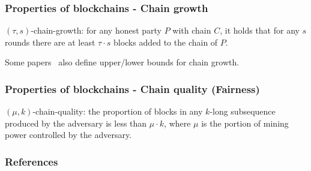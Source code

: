 \documentclass{beamer}
\begin{document}
\begin{frame}
\frametitle{Properties of blockchains - Chain growth}

$(\tau, s)$-chain-growth:
for any honest party $P$ with chain $C$, it holds that for any $s$ rounds there are at least $\tau \cdot s$ blocks added to the chain of $P$.

Some papers~\cite{rocket2018snowflake}\cite{pass2017sleepy} also define upper/lower bounds for chain growth.


\end{frame}


\begin{frame}
\frametitle{Properties of blockchains - Chain quality (Fairness)}
    
$(\mu, k)$-chain-quality: the proportion of blocks in any $k$-long subsequence produced by the adversary is less than $\mu \cdot k$, where $\mu$ is the portion of mining power controlled by the adversary.

\end{frame}


\begin{frame}[allowframebreaks]
    \frametitle{References}
    
    \tiny
\end{frame}
\end{document}

